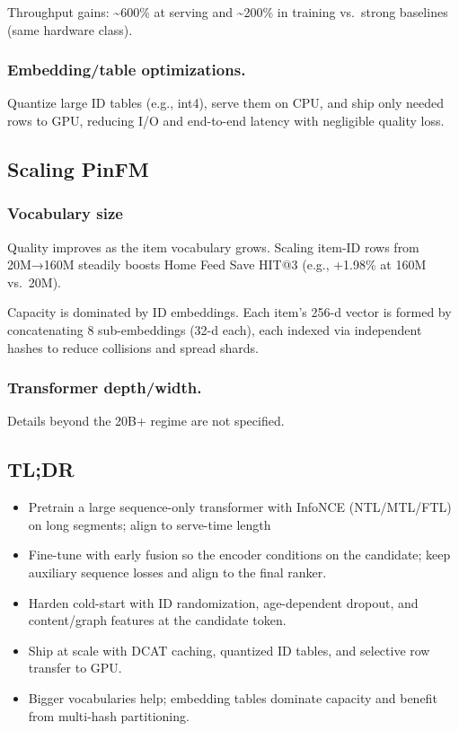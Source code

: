 \documentclass[
  letterpaper,
  DIV=11,
  numbers=noendperiod]{scrartcl}
\begin{document}
Throughput gains: \textasciitilde600\% at serving and
\textasciitilde200\% in training vs.~strong baselines (same hardware
class).

\subsubsection{Embedding/table
optimizations.}\label{embeddingtable-optimizations.}

Quantize large ID tables (e.g., int4), serve them on CPU, and ship only
needed rows to GPU, reducing I/O and end-to-end latency with negligible
quality loss.

\subsection{Scaling PinFM}\label{scaling-pinfm}

\subsubsection{Vocabulary size}\label{vocabulary-size}

Quality improves as the item vocabulary grows. Scaling item-ID rows from
20M→160M steadily boosts Home Feed Save HIT@3 (e.g., +1.98\% at 160M
vs.~20M).

Capacity is dominated by ID embeddings. Each item's 256-d vector is
formed by concatenating 8 sub-embeddings (32-d each), each indexed via
independent hashes to reduce collisions and spread shards.

\subsubsection{Transformer depth/width.}\label{transformer-depthwidth.}

Details beyond the 20B+ regime are not specified.

\subsection{TL;DR}\label{tldr}

\begin{itemize}
\item
  Pretrain a large sequence-only transformer with InfoNCE (NTL/MTL/FTL)
  on long segments; align to serve-time length
\item
  Fine-tune with early fusion so the encoder conditions on the
  candidate; keep auxiliary sequence losses and align to the final
  ranker.
\item
  Harden cold-start with ID randomization, age-dependent dropout, and
  content/graph features at the candidate token.
\item
  Ship at scale with DCAT caching, quantized ID tables, and selective
  row transfer to GPU.
\item
  Bigger vocabularies help; embedding tables dominate capacity and
  benefit from multi-hash partitioning.
\end{itemize}
\end{document}
